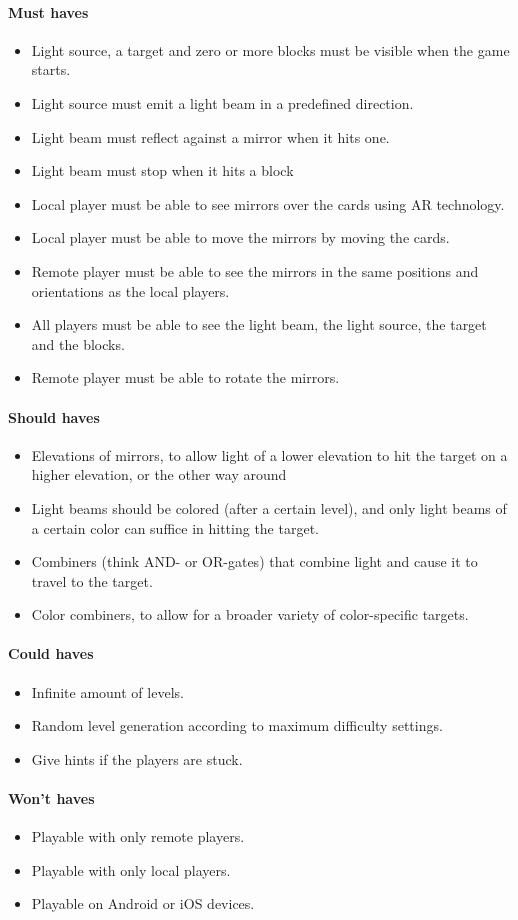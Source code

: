 \paragraph{Must haves}
\begin{itemize}
	\item Light source, a target and zero or more blocks must be visible when the game starts.
	\item Light source must emit a light beam in a predefined direction.
	\item Light beam must reflect against a mirror when it hits one.
	\item Light beam must stop when it hits a block
	\item Local player must be able to see mirrors over the cards using AR technology.
	\item Local player must be able to move the mirrors by moving the cards.
	\item Remote player must be able to see the mirrors in the same positions and 
		  orientations as the local players.
	\item All players must be able to see the light beam, the light source, the target and the blocks.
	\item Remote player must be able to rotate the mirrors.
\end{itemize}

\paragraph{Should haves}
\begin{itemize}
	\item Elevations of mirrors, to allow light of a lower elevation to hit the target on a higher elevation, or the other way around
	\item Light beams should be colored (after a certain level), and only light beams of a certain color can suffice in hitting the target.
	\item Combiners (think AND- or OR-gates) that combine light and cause it to travel to the target.
	\item Color combiners, to allow for a broader variety of color-specific targets.
\end{itemize}

\paragraph{Could haves}
\begin{itemize}
	\item Infinite amount of levels.
	\item Random level generation according to maximum difficulty settings.
	\item Give hints if the players are stuck.
\end{itemize}

\paragraph{Won't haves}
\begin{itemize}
	\item Playable with only remote players.
	\item Playable with only local players.
	\item Playable on Android or iOS devices.
\end{itemize}